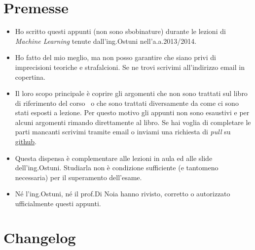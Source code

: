 \section*{Premesse}
\begin{itemize}
\item Ho scritto questi appunti (non sono sbobinature) durante le lezioni di \emph{Machine Learning }tenute dall'ing.\@ Ostuni nell'a.a.\@ 2013/2014. 

\item Ho fatto del mio meglio, ma non posso garantire che siano privi di imprecisioni teoriche e strafalcioni. Se ne trovi scrivimi all'indirizzo email in copertina.

\item Il loro scopo principale è coprire gli argomenti che non sono trattati sul libro di riferimento del corso~\cite{AIMA} o che sono trattati diversamente da come ci sono stati esposti a lezione. Per questo motivo gli appunti non sono esaustivi e per alcuni argomenti rimando direttamente al libro. Se hai voglia di completare le parti mancanti scrivimi tramite email o inviami una richiesta di \emph{pull} su \href{https://github.com/dimatteomaurizio/appunti-machine-learning}{github}.

\item Questa dispensa è complementare alle lezioni in aula ed alle slide dell'ing.\@  Ostuni. Studiarla non è condizione sufficiente (e tantomeno necessaria) per il superamento dell'esame.

\item Né l'ing.\@  Ostuni, né il prof.\@  Di Noia hanno rivisto, corretto o autorizzato ufficialmente questi appunti.
\end{itemize}

\section*{Changelog}

